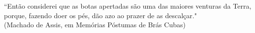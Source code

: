 \newpage
\thispagestyle{empty}

\vspace*{18cm}

\begin{flushright}
 ``Então considerei que as botas apertadas são uma das maiores venturas da Terra,\\
 porque, fazendo doer os pés, dão azo ao prazer de as descalçar." \\
 (Machado de Assis, em Memórias Póstumas de Brás Cubas) \\
\end{flushright}
